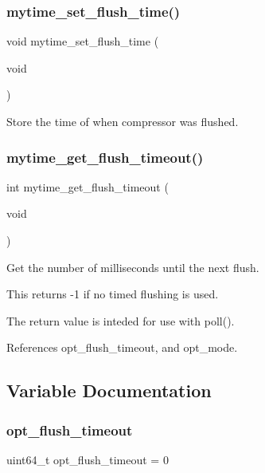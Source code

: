 \subsubsection{mytime\+\_\+set\+\_\+flush\+\_\+time()}
{\footnotesize\ttfamily void mytime\+\_\+set\+\_\+flush\+\_\+time (\begin{DoxyParamCaption}\item[{void}]{ }\end{DoxyParamCaption})}



Store the time of when compressor was flushed. 

\mbox{\label{mytime_8c_ab0193efe1ad07b8eef17bbf712fbe788}} 
\subsubsection{mytime\+\_\+get\+\_\+flush\+\_\+timeout()}
{\footnotesize\ttfamily int mytime\+\_\+get\+\_\+flush\+\_\+timeout (\begin{DoxyParamCaption}\item[{void}]{ }\end{DoxyParamCaption})}



Get the number of milliseconds until the next flush. 

This returns -\/1 if no timed flushing is used.

The return value is inteded for use with poll(). 

References opt\+\_\+flush\+\_\+timeout, and opt\+\_\+mode.



\subsection{Variable Documentation}
\mbox{\label{mytime_8c_a8c313eb268d319b6a5e538628049333a}} 
\subsubsection{opt\+\_\+flush\+\_\+timeout}
{\footnotesize\ttfamily uint64\+\_\+t opt\+\_\+flush\+\_\+timeout = 0}



